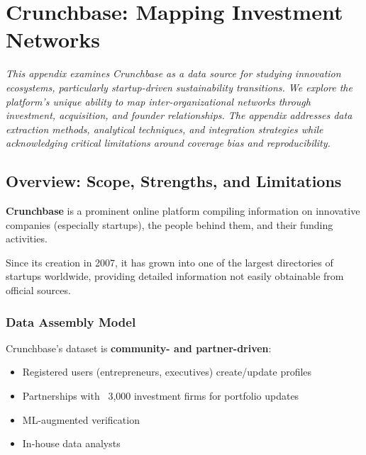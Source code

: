 \chapter{Crunchbase: Mapping Investment Networks}
\label{app:crunchbase}

\noindent\textit{This appendix examines Crunchbase as a data source for studying innovation ecosystems, particularly startup-driven sustainability transitions. We explore the platform's unique ability to map inter-organizational networks through investment, acquisition, and founder relationships. The appendix addresses data extraction methods, analytical techniques, and integration strategies while acknowledging critical limitations around coverage bias and reproducibility.}

\bigskip


\section*{Overview: Scope, Strengths, and Limitations}

\textbf{Crunchbase} is a prominent online platform compiling information on innovative companies (especially startups), the people behind them, and their funding activities.


Since its creation in 2007, it has grown into one of the largest directories of startups worldwide, providing detailed information not easily obtainable from official sources.

\subsection*{Data Assembly Model}

Crunchbase's dataset is \textbf{community- and partner-driven}:
\begin{itemize}[leftmargin=*, itemsep=0.2em]
\item Registered users (entrepreneurs, executives) create/update profiles
\item Partnerships with ~3,000 investment firms for portfolio updates
\item ML-augmented verification
\item In-house data analysts
\end{itemize}


